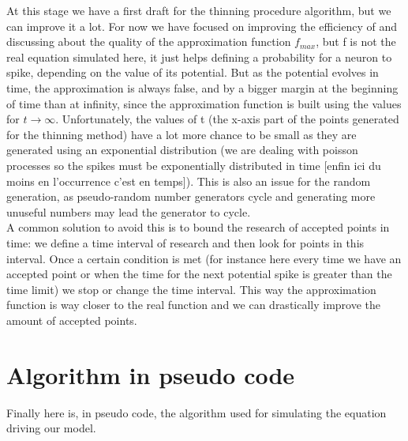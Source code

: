	At this stage we have a first draft for the thinning procedure algorithm, but we can improve it a lot. For now we have focused on improving the efficiency of and discussing about the quality of the approximation function $f_{max}$, but f is not the real equation simulated here, it just helps defining a probability for a neuron to spike, depending on the value of its potential. But as the potential evolves in time, the approximation is always false, and by a bigger margin at the beginning of time than at infinity, since the approximation function is built using the values for $t\rightarrow\infty$. Unfortunately, the values of t (the x-axis part of the points generated for the thinning method) have a lot more chance to be small as they are generated using an exponential distribution (we are dealing with poisson processes so the spikes must be exponentially distributed in time [enfin ici du moins en l'occurrence c'est en temps]). This is also an issue for the random generation, as pseudo-random number generators cycle and generating more unuseful numbers may lead the generator to cycle.\\

	A common solution to avoid this is to bound the research of accepted points in time: we define a time interval of research and then look for points in this interval. Once a certain condition is met (for instance here every time we have an accepted point or when the time for the next potential spike is greater than the time limit) we stop or change the time interval. This way the approximation function is way closer to the real function and we can drastically improve the amount of accepted points.\\


\section{Algorithm in pseudo code}
	Finally here is, in pseudo code, the algorithm used for simulating the equation driving our model.\\

